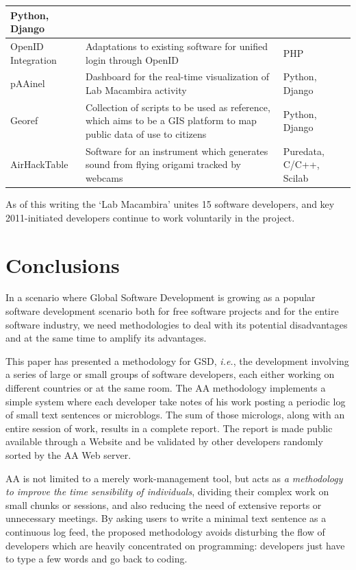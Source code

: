 \documentclass{article}
\newcommand{\ie}{{\it i.e.}}
\begin{document}
\begin{table}
{\begin{tabular}{|l|p{5cm}|l|}
        Python, Django \\
        \hline
        OpenID Integration & Adaptations to existing software for
        unified login through OpenID & PHP \\
        \hline
        pAAinel & Dashboard for the real-time visualization of Lab
        Macambira activity & Python, Django \\
        \hline
        Georef & Collection of scripts to be used as reference, which
        aims to be a GIS platform to map public data of use to
        citizens & Python, Django \\
        \hline
        AirHackTable & Software for an instrument which generates
        sound from flying origami tracked by webcams & Puredata,
        C/C++, Scilab \\
        \hline
        \end{tabular}}
    \label{tabela:criados}
\end{table}

As of this writing the `Lab Macambira' unites 15 software developers, and 
key 2011-initiated developers continue to work voluntarily in the project.

\section{Conclusions}
\label{conclusions}

In a scenario where Global Software Development is growing as a popular 
software development scenario both for free software projects and for the entire
software industry, we need methodologies to deal with its potential disadvantages and at
the same time to amplify its advantages.

This paper has presented a methodology for GSD, \ie, the development
involving a series of large or small groups of software developers, each either working on
different countries or at the same room. The AA methodology
implements a simple system where each developer take notes of his work
posting a periodic log of small text sentences or microblogs. The sum of those
micrologs, along with an entire session of work, results in a complete
report. The report is made public available through a Website and be
validated by other developers randomly sorted by the AA Web server.

AA is not limited to a merely work-management tool, but acts as \emph{a
methodology to improve the time sensibility of individuals}, dividing their
complex work on small chunks or sessions, and also reducing the need of extensive
reports or unnecessary meetings. By asking users to write a minimal
text sentence as a continuous log feed, the proposed methodology avoids
disturbing the flow of developers which are heavily concentrated on programming: developers
just have to type a few words and go back to coding.
\end{document}
